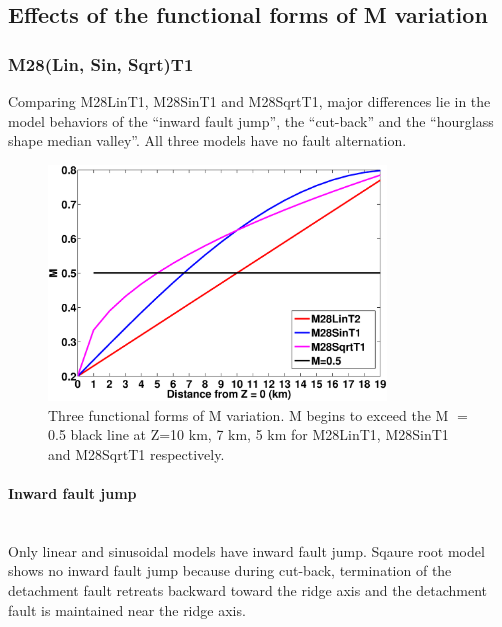 \subsection{Effects of the functional forms of M variation}

\subsubsection{M28(Lin, Sin, Sqrt)T1}

Comparing M28LinT1, M28SinT1 and M28SqrtT1, major differences lie in the model behaviors of the ``inward fault jump'', the ``cut-back'' and the ``hourglass shape median valley''. All three models have no fault alternation.    

\begin{figure}[h]
  \centering
    \includegraphics[width=0.8\textwidth]{./Figures/fig_Results_3_3_M_variation.eps}
  \caption{Three functional forms of M variation. M begins to exceed the M $=$ 0.5 black line at Z=10 km, 7 km, 5 km for M28LinT1, M28SinT1 and M28SqrtT1 respectively.}
 \label{fig_Results3_1}
\end{figure}   

\paragraph{Inward fault jump}\label{para_InwardFaultJump}
~\\
Only linear and sinusoidal models have inward fault jump. Sqaure root model shows no inward fault jump because during cut-back, termination of the detachment fault retreats backward toward the ridge axis and the detachment fault is maintained near the ridge axis.

